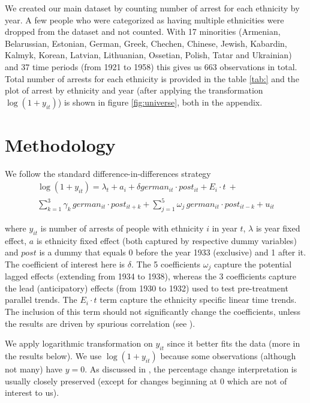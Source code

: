 \documentclass[11pt]{article}
\begin{document}
We created our main dataset by counting number of arrest for each ethnicity by year.  A few people who were categorized as having multiple ethnicities were dropped from the dataset and not counted. 
With 17  minorities (Armenian, Belarussian, Estonian, German, Greek, Chechen, Chinese, Jewish, Kabardin, Kalmyk, Korean, Latvian, Lithuanian, Ossetian, Polish, Tatar and Ukrainian) and 37 time periods (from 1921 to 1958) this gives us 663 observations in total. Total number of arrests for each ethnicity is provided in the table \ref{tab:} and the plot of arrest by ethnicity and year (after applying the transformation $\log\left(1 + y_{it}\right)$) is shown in figure \ref{fig:universe}, both in the appendix. 

\section{Methodology}
We follow the standard difference-in-differences strategy
\begin{multline}
 \log\left(1 + y_{it}\right) = \lambda_t + a_i  + \delta german_{it} \cdot post_{it} + E_i \cdot t \: + \\ \sum_{k= 1}^3 \gamma_k \, german_{it} \cdot post_{it+ k} + \sum_{j= 1}^5 \omega_j \, german_{it} \cdot post_{it - k}  + u_{it}   
\end{multline}

where $y_{it}$ is number of arrests of people with ethnicity $i$ in year $t$, $\lambda$ is year fixed effect, $a$ is ethnicity fixed effect (both captured by respective dummy variables) and $post$ is a dummy that equals 0 before the year 1933 (exclusive) and 1 after it. The coefficient of interest here is $\delta$. The 5 coefficients $\omega_j$ capture the potential lagged effects (extending from 1934 to 1938), whereas the 3 coefficients capture the lead (anticipatory) effects (from 1930 to 1932) used to test pre-treatment parallel trends.  The $ E_i \cdot t$ term capture the ethnicity specific linear time trends. The inclusion of this term should not significantly  change the coefficients, unless the results are driven by spurious correlation (see \citealt{angrist_mostly_2009}). 

 We apply logarithmic transformation on $y_{it}$ since it better fits the data (more in the results below).  We use $\log\left(1 + y_{it}\right)$ because some observations (although not many) have $y = 0$. As discussed in \citet[p. 193]{wooldridge_introductory_2015},  the percentage change interpretation is usually  closely preserved (except for changes beginning at 0 which are not of interest to us).   
\end{document}
